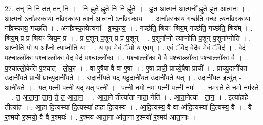 \documentclass[17pt]{extarticle}
\begin{document}
27. तन् नि नि तत् तन् नि । . नि ह्नु॑ते ह्नुते॒ नि नि ह्नु॑ते । . ह्नु॒त॒ आ॒त्मन॑ आ॒त्मनो᳚ ह्नुते ह्नुत आ॒त्मनः॑ । . आ॒त्मनो ऽना᳚व्रस्का॒या ना᳚व्रस्काया॒ त्मन॑ आ॒त्मनो ऽना᳚व्रस्काय । . अना᳚व्रस्काय॒ गच्छ॑ति॒ गच्छ॒ त्यना᳚व्रस्का॒या ना᳚व्रस्काय॒ गच्छ॑ति । . अना᳚व्रस्का॒येत्यना᳚ - व्र॒स्का॒य॒ । . गच्छ॑ति॒ श्रियꣳ॒॒ श्रिय॒म् गच्छ॑ति॒ गच्छ॑ति॒ श्रिय᳚म् । . श्रिय॒म् प्र प्र श्रियꣳ॒॒ श्रिय॒म् प्र । . प्र प॒शून् प॒शून् प्र प्र प॒शून् । . प॒शूना᳚प्नो त्याप्नोति प॒शून् प॒शूना᳚प्नोति । . आ॒प्नो॒ति॒ यो य आ᳚प्नो त्याप्नोति॒ यः । . य ए॒व मे॒वं ॅयो य ए॒वम् । . ए॒वं ॅवेद॒ वेदै॒व मे॒वं ॅवेद॑ । . वेद॑ प॒श्चाल्लो॑का प॒श्चाल्लो॑का॒ वेद॒ वेद॑ प॒श्चाल्लो॑का । . प॒श्चाल्लो॑का॒ वै वै प॒श्चाल्लो॑का प॒श्चाल्लो॑का॒ वै । . प॒श्चाल्लो॒केति॑ प॒श्चात् - लो॒का॒ । . वा ए॒षैषा वै वा ए॒षा । . ए॒षा प्राची॒ प्राच्ये॒षैषा प्राची᳚ । . प्राच्यु॒दानी॑यत उ॒दानी॑यते॒ प्राची॒ प्राच्यु॒दानी॑यते । . उ॒दानी॑यते॒ यद् यदु॒दानी॑यत उ॒दानी॑यते॒ यत् । . उ॒दानी॑यत॒ इत्यु॑त् - आनी॑यते । . यत् पत्नी॒ पत्नी॒ यद् यत् पत्नी᳚ । . पत्नी॒ नमो॒ नमः॒ पत्नी॒ पत्नी॒ नमः॑ । . नम॑स्ते ते॒ नमो॒ नम॑स्ते । . त॒ आ॒ता॒ना॒ ता॒न॒ ते॒ त॒ आ॒ता॒न॒ । . आ॒ता॒ने तीत्या॑ता नाता॒ नेति॑ । . आ॒ता॒नेत्या᳚ - ता॒न॒ । . इत्या॑हा॒हे तीत्या॑ह । . आ॒हा॒ दि॒त्यस्या॑ दि॒त्यस्या॑ हाहा दि॒त्यस्य॑ । . आ॒दि॒त्यस्य॒ वै वा आ॑दि॒त्यस्या॑ दि॒त्यस्य॒ वै । . वै र॒श्मयो॑ र॒श्मयो॒ वै वै र॒श्मयः॑ । . र॒श्मय॑ आता॒ना आ॑ता॒ना र॒श्मयो॑ र॒श्मय॑ आता॒नाः । \newline
\end{document}

